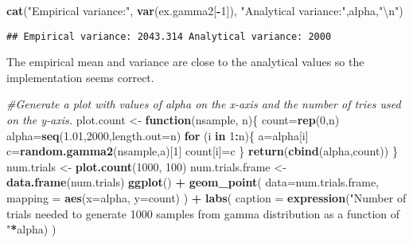 \documentclass[]{article}
\newenvironment{Shaded}{\begin{snugshade}}{\end{snugshade}}
\newcommand{\CharTok}[1]{\textcolor[rgb]{0.31,0.60,0.02}{#1}}
\newcommand{\CommentTok}[1]{\textcolor[rgb]{0.56,0.35,0.01}{\textit{#1}}}
\newcommand{\ControlFlowTok}[1]{\textcolor[rgb]{0.13,0.29,0.53}{\textbf{#1}}}
\newcommand{\DataTypeTok}[1]{\textcolor[rgb]{0.13,0.29,0.53}{#1}}
\newcommand{\DecValTok}[1]{\textcolor[rgb]{0.00,0.00,0.81}{#1}}
\newcommand{\FloatTok}[1]{\textcolor[rgb]{0.00,0.00,0.81}{#1}}
\newcommand{\KeywordTok}[1]{\textcolor[rgb]{0.13,0.29,0.53}{\textbf{#1}}}
\newcommand{\NormalTok}[1]{#1}
\newcommand{\OperatorTok}[1]{\textcolor[rgb]{0.81,0.36,0.00}{\textbf{#1}}}
\newcommand{\StringTok}[1]{\textcolor[rgb]{0.31,0.60,0.02}{#1}}
\begin{document}
\begin{Shaded}
\begin{Highlighting}[]
\KeywordTok{cat}\NormalTok{(}\StringTok{"Empirical variance:"}\NormalTok{, }\KeywordTok{var}\NormalTok{(ex.gamma2[}\OperatorTok{-}\DecValTok{1}\NormalTok{]), }\StringTok{"Analytical variance:"}\NormalTok{,alpha,}\StringTok{"}\CharTok{\textbackslash{}n}\StringTok{"}\NormalTok{)}
\end{Highlighting}
\end{Shaded}

\begin{verbatim}
## Empirical variance: 2043.314 Analytical variance: 2000
\end{verbatim}

The empirical mean and variance are close to the analytical values so
the implementation seems correct.

\begin{Shaded}
\begin{Highlighting}[]
\CommentTok{#Generate a plot with values of alpha on the x-axis and the number of tries used on the y-axis. }
\NormalTok{plot.count <-}\StringTok{ }\ControlFlowTok{function}\NormalTok{(nsample, n)\{}
\NormalTok{  count=}\KeywordTok{rep}\NormalTok{(}\DecValTok{0}\NormalTok{,n)}
\NormalTok{  alpha=}\KeywordTok{seq}\NormalTok{(}\FloatTok{1.01}\NormalTok{,}\DecValTok{2000}\NormalTok{,}\DataTypeTok{length.out=}\NormalTok{n)}
  \ControlFlowTok{for}\NormalTok{ (i }\ControlFlowTok{in} \DecValTok{1}\OperatorTok{:}\NormalTok{n)\{}
\NormalTok{    a=alpha[i]}
\NormalTok{    c=}\KeywordTok{random.gamma2}\NormalTok{(nsample,a)[}\DecValTok{1}\NormalTok{]}
\NormalTok{    count[i]=c}
\NormalTok{  \}}
  \KeywordTok{return}\NormalTok{(}\KeywordTok{cbind}\NormalTok{(alpha,count))}
\NormalTok{\}}
\NormalTok{num.trials <-}\StringTok{ }\KeywordTok{plot.count}\NormalTok{(}\DecValTok{1000}\NormalTok{, }\DecValTok{100}\NormalTok{)}
\NormalTok{num.trials.frame <-}\StringTok{ }\KeywordTok{data.frame}\NormalTok{(num.trials)}
\KeywordTok{ggplot}\NormalTok{() }\OperatorTok{+}
\StringTok{  }\KeywordTok{geom_point}\NormalTok{(}
    \DataTypeTok{data=}\NormalTok{num.trials.frame,}
    \DataTypeTok{mapping =} \KeywordTok{aes}\NormalTok{(}\DataTypeTok{x=}\NormalTok{alpha, }\DataTypeTok{y=}\NormalTok{count)}
\NormalTok{  ) }\OperatorTok{+}
\StringTok{  }\KeywordTok{labs}\NormalTok{(}
    \DataTypeTok{caption =} \KeywordTok{expression}\NormalTok{(}\StringTok{"Number of trials needed to generate 1000 samples from gamma distribution as a function of "}\OperatorTok{*}\NormalTok{alpha)}
\NormalTok{  )}
\end{Highlighting}
\end{Shaded}
\end{document}
